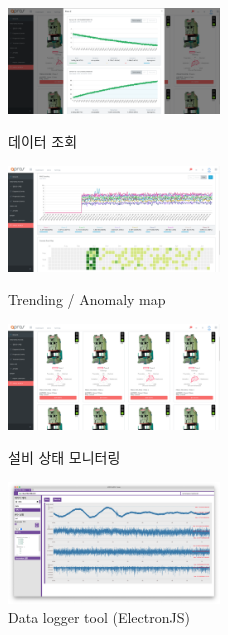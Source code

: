 \documentclass[10pt,a4paper,ragged2e]{altacv}
\begin{document}
\begin{fullwidth}
\begin{figure}[!ht]
\begin{fullwidth}
{    \centering
    \includegraphics[width=0.5\textwidth]{images/new_dashboard_05.png}
    \caption*{데이터 조회}
    }
    \parbox{0.5\textwidth}{
    \centering
    \includegraphics[width=0.5\textwidth]{images/new_dashboard_06.png}
    \caption*{Trending / Anomaly map}
    }\qquad
    \parbox{0.5\textwidth}{
    \centering
    \includegraphics[width=0.5\textwidth]{images/new_dashboard_04.png}
    \caption*{설비 상태 모니터링}
    }\qquad
    \parbox{0.5\textwidth}{
    \centering
    \includegraphics[width=0.5\textwidth]{images/mcdl-01.png}
    \caption*{Data logger tool (ElectronJS)}
    }
  \end{fullwidth}
\end{figure}

\end{fullwidth}
\end{document}

